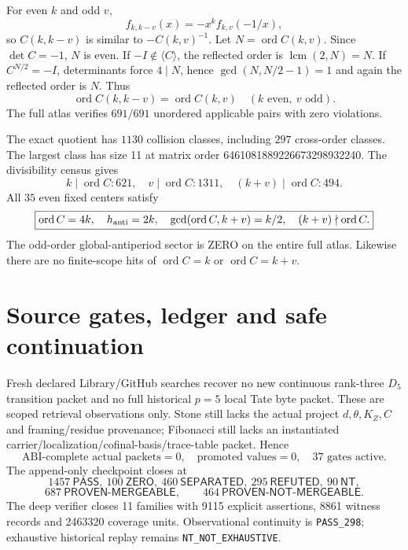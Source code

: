 \documentclass[9.5pt,a4paper]{article}
\newcommand{\PASS}{\textsf{PASS}}\newcommand{\ZERO}{\textsf{ZERO}}\newcommand{\SEP}{\textsf{SEPARATED}}\newcommand{\REF}{\textsf{REFUTED}}\newcommand{\NT}{\textsf{NT}}
\begin{document}
For even $k$ and odd $v$,
\[
f_{k,k-v}(x)=-x^k f_{k,v}(-1/x),
\]
so $C(k,k-v)$ is similar to $-C(k,v)^{-1}$.  Let $N=\operatorname{ord}C(k,v)$.  Since $\det C=-1$, $N$ is even.  If $-I\notin\langle C\rangle$, the reflected order is $\operatorname{lcm}(2,N)=N$.  If $C^{N/2}=-I$, determinants force $4\mid N$, hence $\gcd(N,N/2-1)=1$ and again the reflected order is $N$.  Thus
\[
\boxed{\operatorname{ord}C(k,k-v)=\operatorname{ord}C(k,v)\quad(k\text{ even},\ v\text{ odd}).}
\]
The full atlas verifies $691/691$ unordered applicable pairs with zero violations.

The exact quotient has $1130$ collision classes, including $297$ cross-order classes.  The largest class has size 11 at matrix order 6461081889226673298932240.  The divisibility census gives
\[
\boxed{k\mid\operatorname{ord}C:621,\quad v\mid\operatorname{ord}C:1311,\quad(k+v)\mid\operatorname{ord}C:494.}
\]
All $35$ even fixed centers satisfy
\[
\boxed{\operatorname{ord}C=4k,\quad h_{\rm anti}=2k,\quad \gcd(\operatorname{ord}C,k+v)=k/2,\quad(k+v)\nmid\operatorname{ord}C.}
\]
The odd-order global-antiperiod sector is \ZERO{} on the entire full atlas.  Likewise there are no finite-scope hits of $\operatorname{ord}C=k$ or $\operatorname{ord}C=k+v$.

\section{Source gates, ledger and safe continuation}
Fresh declared Library/GitHub searches recover no new continuous rank-three $D_5$ transition packet and no full historical $p=5$ local Tate byte packet.  These are scoped retrieval observations only.  Stone still lacks the actual project $d,\theta,K_Z,C$ and framing/residue provenance; Fibonacci still lacks an instantiated carrier/localization/cofinal-basis/trace-table packet.  Hence
\[
\boxed{\text{ABI-complete actual packets}=0,\quad\text{promoted values}=0,\quad37\text{ gates active}.}
\]
The append-only checkpoint closes at
\[
\boxed{1457\ \PASS,\ 100\ \ZERO,\ 460\ \SEP,\ 295\ \REF,\ 90\ \NT},
\]
\[
\boxed{687\ \textsf{PROVEN-MERGEABLE},\qquad464\ \textsf{PROVEN-NOT-MERGEABLE}.}
\]
The deep verifier closes 11 families with 9115 explicit assertions, 8861 witness records and 2463320 coverage units.  Observational continuity is \texttt{PASS\_298}; exhaustive historical replay remains \texttt{NT\_NOT\_EXHAUSTIVE}.
\end{document}
